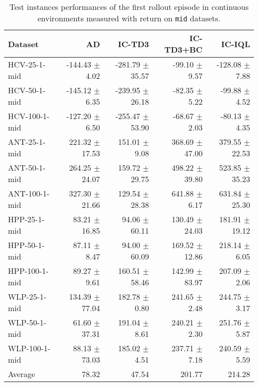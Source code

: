 \begin{table}[ht]
    \label{tab:}
    \begin{center}
    \caption{Test instances performances of the first rollout episode in continuous environments measured with return on \texttt{mid} datasets.}
    \begin{small}
    \begin{adjustbox}{max width=\columnwidth}
		\begin{tabular}{l|rrrr}
		\toprule
	\textbf{Dataset} & \textbf{AD} & \textbf{IC-TD3} & \textbf{IC-TD3+BC} & \textbf{IC-IQL}\\
\midrule
HCV-25-1-mid & -144.43 $\pm$ 4.02 & -281.79 $\pm$ 35.57 & -99.10 $\pm$ 9.57 & -128.08 $\pm$ 7.88\\
HCV-50-1-mid & -145.12 $\pm$ 6.35 & -239.95 $\pm$ 26.18 & -82.35 $\pm$ 5.22 & -99.88 $\pm$ 4.52\\
HCV-100-1-mid & -127.20 $\pm$ 6.50 & -255.47 $\pm$ 53.90 & -68.67 $\pm$ 2.03 & -80.13 $\pm$ 4.35\\
ANT-25-1-mid & 221.32 $\pm$ 17.53 & 151.01 $\pm$ 9.08 & 368.69 $\pm$ 47.00 & 379.55 $\pm$ 22.53\\
ANT-50-1-mid & 264.25 $\pm$ 24.07 & 159.72 $\pm$ 29.75 & 498.22 $\pm$ 39.80 & 523.85 $\pm$ 35.23\\
ANT-100-1-mid & 327.30 $\pm$ 21.66 & 129.54 $\pm$ 28.38 & 641.88 $\pm$ 6.17 & 631.84 $\pm$ 25.30\\
HPP-25-1-mid & 83.21 $\pm$ 16.85 & 94.06 $\pm$ 60.11 & 130.49 $\pm$ 24.03 & 181.91 $\pm$ 19.12\\
HPP-50-1-mid & 87.11 $\pm$ 8.47 & 94.00 $\pm$ 60.09 & 169.52 $\pm$ 12.86 & 218.14 $\pm$ 6.05\\
HPP-100-1-mid & 89.27 $\pm$ 9.61 & 160.51 $\pm$ 58.46 & 142.99 $\pm$ 83.97 & 207.09 $\pm$ 2.06\\
WLP-25-1-mid & 134.39 $\pm$ 77.04 & 182.78 $\pm$ 0.80 & 241.65 $\pm$ 2.48 & 244.75 $\pm$ 3.17\\
WLP-50-1-mid & 61.60 $\pm$ 37.31 & 191.04 $\pm$ 8.61 & 240.21 $\pm$ 2.30 & 251.76 $\pm$ 5.87\\
WLP-100-1-mid & 88.13 $\pm$ 73.03 & 185.02 $\pm$ 4.51 & 237.71 $\pm$ 7.18 & 240.59 $\pm$ 5.59\\
\midrule
Average & 78.32 & 47.54 & 201.77 & 214.28\\
\end{tabular}
        \end{adjustbox}
    \end{small}
    \end{center}
    \vskip -0.1in
\end{table}
    